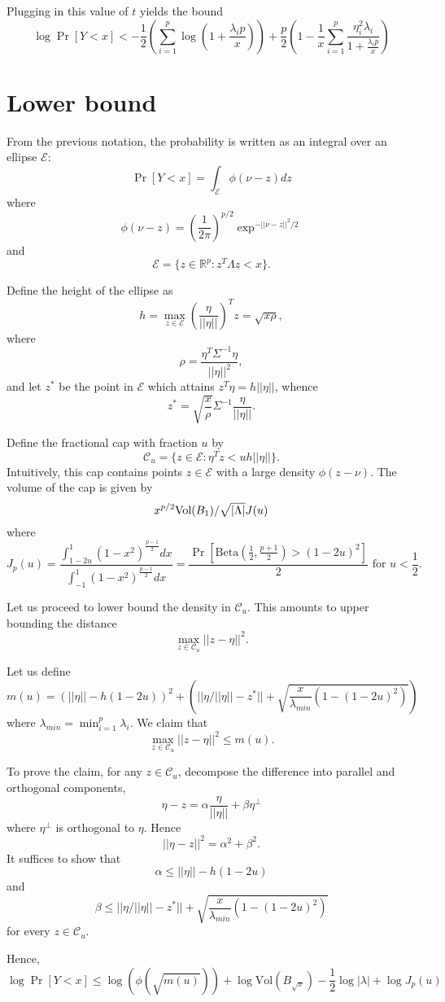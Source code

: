 \documentclass[12pt]{article}
\begin{document}
Plugging in this value of $t$ yields the bound
\[
\log \Pr[Y < x] < -\frac{1}{2}\left(\sum_{i=1}^p \log\left(1 + \frac{\lambda_i p}{x}\right)\right) + 
\frac{p}{2} \left(1 - \frac{1}{x}\sum_{i=1}^p \frac{\eta_i^2 \lambda_i}{1 + \frac{\lambda_i p}{x}}\right)
\]

\section{Lower bound}

From the previous notation, the probability is written as an integral over an ellipse $\mathcal{E}$:
\[
\Pr[Y < x] = \int_{\mathcal{E}} \phi(\nu - z) dz
\]
where
\[
\phi(\nu - z) = \left(\frac{1}{2\pi}\right)^{p/2} \exp^{-||\nu - z||^2/2}
\]
and
\[
\mathcal{E} = \{z \in \mathbb{R}^p: z^T \Lambda z < x\}.
\]

Define the height of the ellipse as
\[
h = \max_{z \in \mathcal{E}} \left(\frac{\eta}{||\eta||}\right)^T z = \sqrt{x \rho},
\]
where
\[
\rho = \frac{\eta^T \Sigma^{-1}\eta}{||\eta||^2},
\]
and let $z^*$ be the point in $\mathcal{E}$ which attains $z^T\eta = h||\eta||$,
whence
\[
z^* = \sqrt{\frac{x}{\rho}} \Sigma^{-1} \frac{\eta}{||\eta||}.
\]


Define the fractional cap with fraction $u$ by
\[
\mathcal{C}_u = \{z \in \mathcal{E}: \eta^T z < uh||\eta|| \}.
\]
Intuitively, this cap contains points $z \in \mathcal{E}$ with a large density $\phi(z - \nu)$.
The volume of the cap is given by
\[
x^{p/2}\text{Vol}(B_1)/\sqrt{|\Lambda|} J(u)
\]
where
\[
J_p(u) = \frac{\int_{1-2u}^1 (1-x^2)^{\frac{p-1}{2}} dx}{\int_{-1}^1 (1-x^2)^{\frac{p-1}{2}} dx} = 
\frac{\Pr[\text{Beta}(\frac{1}{2}, \frac{p+1}{2}) > (1-2u)^2]}{2}\text{ for }u < \frac{1}{2}.
\]

Let us proceed to lower bound the density in $\mathcal{C}_u$.
This amounts to upper bounding the distance
\[
\max_{z \in \mathcal{C}_u} ||z - \eta||^2.
\]

Let us define
\[
m(u) = (||\eta|| - h(1-2u))^2 + \left(||\eta/||\eta|| - z^*|| + \sqrt{\frac{x}{\lambda_{min}} (1-(1-2u)^2)}\right)
\]
where $\lambda_{min} = \min_{i=1}^p \lambda_i$.
We claim that
\[
\max_{z \in \mathcal{C}_u} ||z - \eta||^2 \leq m(u).
\]

To prove the claim, for any $z \in \mathcal{C}_u$, decompose the difference into parallel and orthogonal components,
\[
\eta - z = \alpha \frac{\eta}{||\eta||} + \beta \eta^\perp
\]
where $\eta^\perp$ is orthogonal to $\eta$.
Hence
\[
||\eta - z||^2 = \alpha^2 + \beta^2.
\]
It suffices to show that
\[
\alpha \leq ||\eta|| - h(1-2u)
\]
and
\[
\beta \leq ||\eta/||\eta|| - z^*|| + \sqrt{\frac{x}{\lambda_{min}} (1-(1-2u)^2)}
\]
for every $z \in \mathcal{C}_u$.

Hence,
\[
\log\Pr[Y < x] \leq \log(\phi(\sqrt{m(u)})) + \log\text{Vol}(B_{\sqrt{x}}) - \frac{1}{2}\log|\lambda|
+ \log J_p(u)
\]
\end{document}
